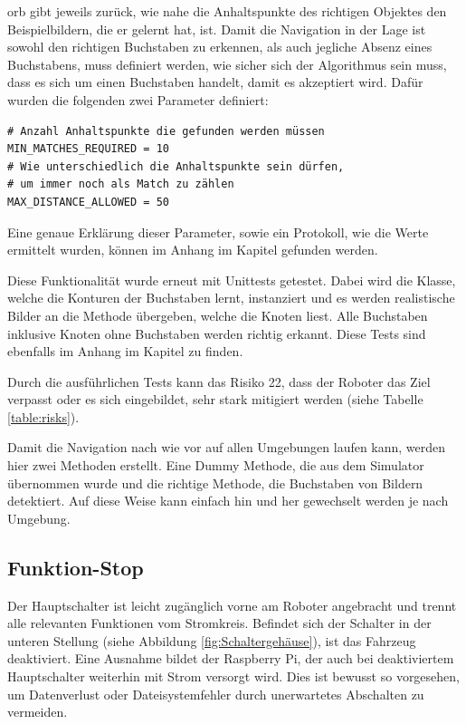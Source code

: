 \acrshort{orb} gibt jeweils zurück, wie nahe die Anhaltspunkte des richtigen Objektes den Beispielbildern, die er gelernt hat, ist. Damit die Navigation in der Lage ist sowohl den richtigen Buchstaben zu erkennen, als auch jegliche Absenz eines Buchstabens, muss definiert werden, wie sicher sich der Algorithmus sein muss, dass es sich um einen Buchstaben handelt, damit es akzeptiert wird. Dafür wurden die folgenden zwei Parameter definiert:
\begin{verbatim}
# Anzahl Anhaltspunkte die gefunden werden müssen
MIN_MATCHES_REQUIRED = 10
# Wie unterschiedlich die Anhaltspunkte sein dürfen,
# um immer noch als Match zu zählen
MAX_DISTANCE_ALLOWED = 50
\end{verbatim}

Eine genaue Erklärung dieser Parameter, sowie ein Protokoll, wie die Werte ermittelt wurden, können im Anhang im Kapitel  gefunden werden.

Diese Funktionalität wurde erneut mit Unittests getestet.
Dabei wird die Klasse, welche die Konturen der Buchstaben lernt, instanziert und es werden realistische Bilder an die Methode übergeben, welche die Knoten liest. Alle Buchstaben inklusive Knoten ohne Buchstaben werden richtig erkannt. Diese Tests sind ebenfalls im Anhang im Kapitel  zu finden.

Durch die ausführlichen Tests kann das Risiko 22, dass der Roboter das Ziel verpasst oder es sich eingebildet, sehr stark mitigiert werden (siehe Tabelle \ref{table:risks}).

Damit die Navigation nach wie vor auf allen Umgebungen laufen kann, werden hier zwei Methoden erstellt. Eine Dummy Methode, die aus dem Simulator übernommen wurde und die richtige Methode, die Buchstaben von Bildern detektiert. Auf diese Weise kann einfach hin und her gewechselt werden je nach Umgebung.


\newpage
\subsection{Funktion-Stop}


Der Hauptschalter ist leicht zugänglich vorne am Roboter angebracht und trennt alle relevanten Funktionen vom Stromkreis. Befindet sich der Schalter in der unteren Stellung (siehe Abbildung \ref{fig:Schaltergehäuse}), ist das Fahrzeug deaktiviert.
Eine Ausnahme bildet der Raspberry Pi, der auch bei deaktiviertem Hauptschalter weiterhin mit Strom versorgt wird. Dies ist bewusst so vorgesehen, um Datenverlust oder Dateisystemfehler durch unerwartetes Abschalten zu vermeiden.

